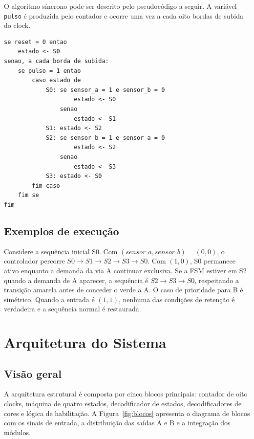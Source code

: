 \documentclass[conference]{IEEEtran}
\begin{document}
O algoritmo síncrono pode ser descrito pelo pseudocódigo a seguir. A variável
\texttt{pulso} é produzida pelo contador e ocorre uma vez a cada oito bordas
de subida do clock.

\begin{lstlisting}[caption={Pseudocodigo da logica de transicao},
label={lst:pseudocodigo}]
se reset = 0 entao
    estado <- S0
senao, a cada borda de subida:
    se pulso = 1 entao
        caso estado de
            S0: se sensor_a = 1 e sensor_b = 0
                    estado <- S0
                senao
                    estado <- S1
            S1: estado <- S2
            S2: se sensor_b = 1 e sensor_a = 0
                    estado <- S2
                senao
                    estado <- S3
            S3: estado <- S0
        fim caso
    fim se
fim
\end{lstlisting}

\subsection{Exemplos de execução}

Considere a sequência inicial S0. Com
\((sensor\_a,sensor\_b)=(0,0)\), o controlador percorre
\(S0\rightarrow S1\rightarrow S2\rightarrow S3\rightarrow S0\).
Com \((1,0)\), S0 permanece ativo enquanto a demanda da via A continuar
exclusiva. Se a FSM estiver em S2 quando a demanda de A aparecer, a
sequência é \(S2\rightarrow S3\rightarrow S0\), respeitando a transição
amarela antes de conceder o verde a A. O caso de prioridade para B é
simétrico. Quando a entrada é \((1,1)\), nenhuma das condições de retenção é
verdadeira e a sequência normal é restaurada.

\section{Arquitetura do Sistema}
\label{sec:arquitetura}

\subsection{Visão geral}

A arquitetura estrutural é composta por cinco blocos principais: contador de
oito clocks, máquina de quatro estados, decodificador de estados,
decodificadores de cores e lógica de habilitação. A Figura~\ref{fig:blocos}
apresenta o diagrama de blocos com os sinais de entrada, a distribuição das
saídas A e B e a integração dos módulos.
\end{document}
